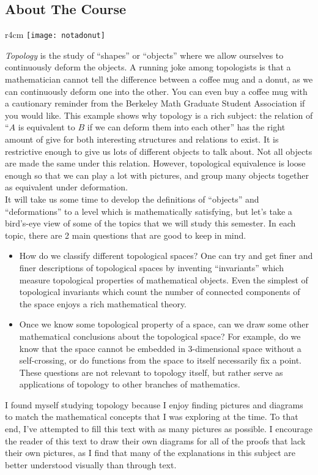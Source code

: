 \subsection{About The Course}
\begin{wrapfigure}{r}{4cm}
\centering
\texttt{[image: notadonut]}
\end{wrapfigure}
\emph{Topology} is the study of ``shapes'' or ``objects'' where we allow ourselves to continuously deform the objects. A running joke among topologists is that a mathematician cannot tell the difference between a coffee mug and a donut, as we can continuously deform one into the other. You can even buy a coffee mug with a cautionary reminder from the Berkeley Math Graduate Student Association if you would like.
This example shows why topology is a rich subject: the relation of ``$A$ is equivalent to $B$ if we can deform them into each other'' has the right amount of give for both interesting structures and relations to exist. It is restrictive enough to give us lots of different objects to talk about. Not all objects are made the same under this relation. However, topological equivalence is loose enough so that we can play a lot with pictures, and group many objects together as equivalent under deformation. \\
It will take us some time to develop the definitions of ``objects'' and ``deformations'' to a level which is mathematically satisfying, but let's take a bird's-eye view of some of the topics that we will study this semester.  In each topic, there are 2 main questions that are good to keep in mind. 
\begin{itemize}
	\item How do we classify different topological spaces? One can try and get finer and finer descriptions of topological spaces by inventing ``invariants'' which measure topological properties of mathematical objects. Even the simplest of topological invariants which count the number of connected components of the space enjoys a rich mathematical theory. 
	\item Once we know some topological property of a space, can we draw some other mathematical conclusions about the topological space? For example, do we know that the space cannot be embedded in 3-dimensional space without a self-crossing, or do functions from the space to itself necessarily fix a point. These questions are not relevant to topology itself, but rather serve as applications of topology to other branches of mathematics. 
\end{itemize}
I found myself studying topology because I enjoy finding pictures and diagrams to match the mathematical concepts that I was exploring at the time. To that end, I've attempted to fill this text with as many pictures as possible. I encourage the reader of this text to draw their own diagrams for all of the proofs that lack their own pictures, as I find that many of the explanations in this subject are better understood visually than through text.

